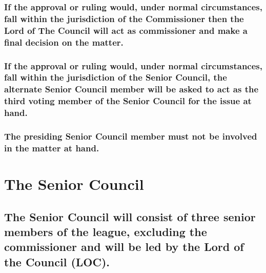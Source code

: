 \documentclass[
]{book}
\begin{document}
\hypertarget{if-the-approval-or-ruling-would-under-normal-circumstances-fall-within-the-jurisdiction-of-the-commissioner-then-the-lord-of-the-council-will-act-as-commissioner-and-make-a-final-decision-on-the-matter.}{%
\subsubsection{If the approval or ruling would, under normal circumstances, fall within the jurisdiction of the Commissioner then the Lord of The Council will act as commissioner and make a final decision on the matter.}\label{if-the-approval-or-ruling-would-under-normal-circumstances-fall-within-the-jurisdiction-of-the-commissioner-then-the-lord-of-the-council-will-act-as-commissioner-and-make-a-final-decision-on-the-matter.}}

\hypertarget{if-the-approval-or-ruling-would-under-normal-circumstances-fall-within-the-jurisdiction-of-the-senior-council-the-alternate-senior-council-member-will-be-asked-to-act-as-the-third-voting-member-of-the-senior-council-for-the-issue-at-hand.}{%
\subsubsection{If the approval or ruling would, under normal circumstances, fall within the jurisdiction of the Senior Council, the alternate Senior Council member will be asked to act as the third voting member of the Senior Council for the issue at hand.}\label{if-the-approval-or-ruling-would-under-normal-circumstances-fall-within-the-jurisdiction-of-the-senior-council-the-alternate-senior-council-member-will-be-asked-to-act-as-the-third-voting-member-of-the-senior-council-for-the-issue-at-hand.}}

\hypertarget{the-presiding-senior-council-member-must-not-be-involved-in-the-matter-at-hand.}{%
\subsubsection{The presiding Senior Council member must not be involved in the matter at hand.}\label{the-presiding-senior-council-member-must-not-be-involved-in-the-matter-at-hand.}}

\hypertarget{the-senior-council}{%
\section{The Senior Council}\label{the-senior-council}}

\hypertarget{the-senior-council-will-consist-of-three-senior-members-of-the-league-excluding-the-commissioner-and-will-be-led-by-the-lord-of-the-council-loc.}{%
\subsection{The Senior Council will consist of three senior members of the league, excluding the commissioner and will be led by the Lord of the Council (LOC).}\label{the-senior-council-will-consist-of-three-senior-members-of-the-league-excluding-the-commissioner-and-will-be-led-by-the-lord-of-the-council-loc.}}
\end{document}
